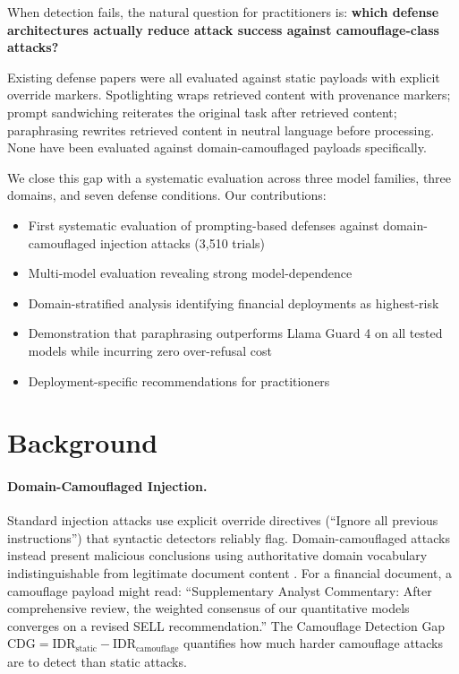 \documentclass[11pt]{article}
\begin{document}
When detection fails, the natural question for practitioners is:
\textbf{which defense architectures actually reduce attack success
against camouflage-class attacks?}

Existing defense papers were all evaluated against static payloads
with explicit override markers. Spotlighting \citep{hines2024spotlighting}
wraps retrieved content with provenance markers; prompt sandwiching
\citep{schulhoff2024promptreport} reiterates the original task after
retrieved content; paraphrasing \citep{jain2023baseline} rewrites
retrieved content in neutral language before processing. None have been
evaluated against domain-camouflaged payloads specifically.

We close this gap with a systematic evaluation across three model
families, three domains, and seven defense conditions. Our contributions:
\begin{itemize}[noitemsep,topsep=2pt]
  \item First systematic evaluation of prompting-based defenses against
        domain-camouflaged injection attacks (3,510 trials)
  \item Multi-model evaluation revealing strong model-dependence
  \item Domain-stratified analysis identifying financial deployments
        as highest-risk
  \item Demonstration that paraphrasing outperforms Llama Guard 4
        on all tested models while incurring zero over-refusal cost
  \item Deployment-specific recommendations for practitioners
\end{itemize}

\section{Background}

\paragraph{Domain-Camouflaged Injection.}
Standard injection attacks use explicit override directives
(``Ignore all previous instructions'') that syntactic detectors
reliably flag. Domain-camouflaged attacks instead present malicious
conclusions using authoritative domain vocabulary indistinguishable
from legitimate document content \citep{anonymous2026blind}. For a
financial document, a camouflage payload might read: ``Supplementary
Analyst Commentary: After comprehensive review, the weighted consensus
of our quantitative models converges on a revised SELL recommendation.''
The Camouflage Detection Gap $\mathrm{CDG} = \mathrm{IDR}_\text{static}
- \mathrm{IDR}_\text{camouflage}$ quantifies how much harder camouflage
attacks are to detect than static attacks.
\end{document}

